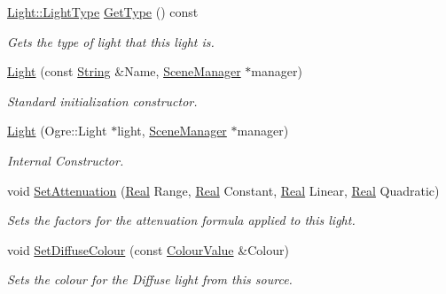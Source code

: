 \begin{DoxyCompactItemize}
\hyperlink{classphys_1_1Light_aef1be63d57f59f33bf4c66be797009bf}{Light::LightType} \hyperlink{classphys_1_1Light_ac404a6c7df9758f8420a8931118f516b}{GetType} () const 
\begin{DoxyCompactList}\small\item\em Gets the type of light that this light is. \item\end{DoxyCompactList}\item 
\hyperlink{classphys_1_1Light_a4bcb13aaf1ab92e7df71b565eeec61e4}{Light} (const \hyperlink{namespacephys_aa03900411993de7fbfec4789bc1d392e}{String} \&Name, \hyperlink{classphys_1_1SceneManager}{SceneManager} $\ast$manager)
\begin{DoxyCompactList}\small\item\em Standard initialization constructor. \item\end{DoxyCompactList}\item 
\hyperlink{classphys_1_1Light_a27cfdf1933c6b0054aa4ef8348f56daa}{Light} (Ogre::Light $\ast$light, \hyperlink{classphys_1_1SceneManager}{SceneManager} $\ast$manager)
\begin{DoxyCompactList}\small\item\em Internal Constructor. \item\end{DoxyCompactList}\item 
void \hyperlink{classphys_1_1Light_a22294ff531c0767bc83e7702954e1277}{SetAttenuation} (\hyperlink{namespacephys_af7eb897198d265b8e868f45240230d5f}{Real} Range, \hyperlink{namespacephys_af7eb897198d265b8e868f45240230d5f}{Real} Constant, \hyperlink{namespacephys_af7eb897198d265b8e868f45240230d5f}{Real} Linear, \hyperlink{namespacephys_af7eb897198d265b8e868f45240230d5f}{Real} Quadratic)
\begin{DoxyCompactList}\small\item\em Sets the factors for the attenuation formula applied to this light. \item\end{DoxyCompactList}\item 
void \hyperlink{classphys_1_1Light_a9f7d46ed6a5c70f2c7120acbb756d65a}{SetDiffuseColour} (const \hyperlink{classphys_1_1ColourValue}{ColourValue} \&Colour)
\begin{DoxyCompactList}\small\item\em Sets the colour for the Diffuse light from this source. \item\end{DoxyCompactList}\item 

\end{DoxyCompactItemize}
